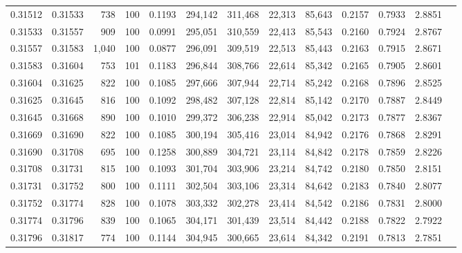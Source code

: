 \begin{tabular}{rrrrrrrrrrrrr}
0.31512 & 0.31533 &   738 & 100 &                                     0.1193 & 294,142 & 311,468 &  22,313 &  85,643 & 0.2157 & 0.7933 & 2.8851 \\
0.31533 & 0.31557 &   909 & 100 &                                     0.0991 & 295,051 & 310,559 &  22,413 &  85,543 & 0.2160 & 0.7924 & 2.8767 \\
0.31557 & 0.31583 & 1,040 & 100 &                                     0.0877 & 296,091 & 309,519 &  22,513 &  85,443 & 0.2163 & 0.7915 & 2.8671 \\
0.31583 & 0.31604 &   753 & 101 &                                     0.1183 & 296,844 & 308,766 &  22,614 &  85,342 & 0.2165 & 0.7905 & 2.8601 \\
0.31604 & 0.31625 &   822 & 100 &                                     0.1085 & 297,666 & 307,944 &  22,714 &  85,242 & 0.2168 & 0.7896 & 2.8525 \\
0.31625 & 0.31645 &   816 & 100 &                                     0.1092 & 298,482 & 307,128 &  22,814 &  85,142 & 0.2170 & 0.7887 & 2.8449 \\
0.31645 & 0.31668 &   890 & 100 &                                     0.1010 & 299,372 & 306,238 &  22,914 &  85,042 & 0.2173 & 0.7877 & 2.8367 \\
0.31669 & 0.31690 &   822 & 100 &                                     0.1085 & 300,194 & 305,416 &  23,014 &  84,942 & 0.2176 & 0.7868 & 2.8291 \\
0.31690 & 0.31708 &   695 & 100 &                                     0.1258 & 300,889 & 304,721 &  23,114 &  84,842 & 0.2178 & 0.7859 & 2.8226 \\
0.31708 & 0.31731 &   815 & 100 &                                     0.1093 & 301,704 & 303,906 &  23,214 &  84,742 & 0.2180 & 0.7850 & 2.8151 \\
0.31731 & 0.31752 &   800 & 100 &                                     0.1111 & 302,504 & 303,106 &  23,314 &  84,642 & 0.2183 & 0.7840 & 2.8077 \\
0.31752 & 0.31774 &   828 & 100 &                                     0.1078 & 303,332 & 302,278 &  23,414 &  84,542 & 0.2186 & 0.7831 & 2.8000 \\
0.31774 & 0.31796 &   839 & 100 &                                     0.1065 & 304,171 & 301,439 &  23,514 &  84,442 & 0.2188 & 0.7822 & 2.7922 \\
0.31796 & 0.31817 &   774 & 100 &                                     0.1144 & 304,945 & 300,665 &  23,614 &  84,342 & 0.2191 & 0.7813 & 2.7851 \\

\end{tabular}
